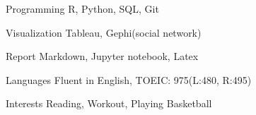 



\begin{cvskills}

    \cvskill
    {Programming}  %
    {R, Python, SQL, Git} %

    \cvskill
    {Visualization}  %
    {Tableau, Gephi(social network)} %

    \cvskill
    {Report}  %
    {Markdown, Jupyter notebook, Latex} %

    \cvskill
    {Languages}  %
    {Fluent in English, TOEIC: 975(L:480, R:495)} %
    
    \cvskill
    {Interests}  %
    {Reading, Workout, Playing Basketball} %
\end{cvskills}